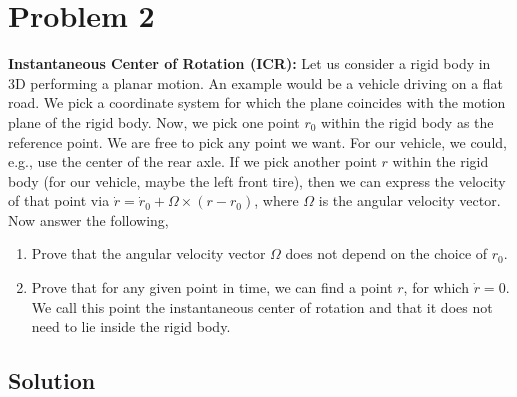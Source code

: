 \section*{Problem 2}

\textbf{Instantaneous Center of Rotation (ICR):}
Let us consider a rigid body in 3D performing a planar motion.
An example would be a vehicle driving on a flat road.
We pick a coordinate system for which the plane coincides with the motion plane of the rigid body.
Now, we pick one point \(r_0\) within the rigid body as the reference point.
We are free to pick any point we want.
For our vehicle, we could, e.g., use the center of the rear axle.
If we pick another point \(r\) within the rigid body (for our vehicle, maybe the left front tire), then we can express the velocity of that point via \(\dot r=\dot r_0 + \Omega\times(r-r_0)\), where \( \Omega \) is the angular velocity vector.
Now answer the following,
\begin{enumerate}[label= (\alph*)]
    \item Prove that the angular velocity vector \( \Omega \) does not depend on the choice of \(r_0\).
    \item Prove that for any given point in time, we can find a point \(r\), for which \(\dot r  = 0\).
          We call this point the instantaneous center of rotation and that it does not need to lie inside the rigid body.
\end{enumerate}

\subsection*{Solution}

